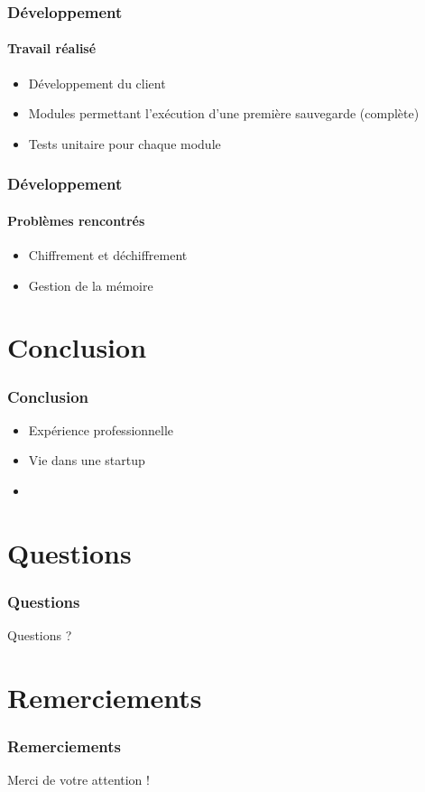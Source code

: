 \documentclass{beamer}
\begin{document}
\begin{frame}
 \frametitle{D\'eveloppement}
 \framesubtitle{Travail r\'ealis\'e}
 \begin{itemize}
  \item D\'eveloppement du client
  \item Modules permettant l'ex\'ecution d'une premi\`ere sauvegarde
  (compl\`ete)
  \item Tests unitaire pour chaque module
 \end{itemize}
\end{frame}

\begin{frame}
 \frametitle{D\'eveloppement}
 \framesubtitle{Probl\`emes rencontr\'es}
 \begin{itemize}
  \item Chiffrement et d\'echiffrement
  \item Gestion de la m\'emoire
 \end{itemize}
\end{frame}

\section{Conclusion}
\begin{frame}
 \frametitle{Conclusion}
 \begin{itemize}
  \item Expérience professionnelle 
  \item Vie dans une startup
  \item 
 \end{itemize}
\end{frame}


\section*{Questions}
\begin{frame}
\frametitle{Questions}
Questions ?
\end{frame}

\section*{Remerciements}
\begin{frame}
 \frametitle{Remerciements}
 Merci de votre attention !
\end{frame}
\end{document}
